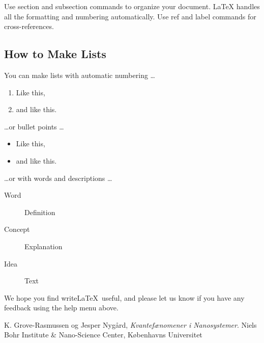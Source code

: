 \documentclass[a4paper]{article}
\begin{document}
Use section and subsection commands to organize your document. \LaTeX{} handles all the formatting and numbering automatically. Use ref and label commands for cross-references.

\subsection{How to Make Lists}

You can make lists with automatic numbering \dots

\begin{enumerate}
\item Like this,
\item and like this.
\end{enumerate}
\dots or bullet points \dots
\begin{itemize}
\item Like this,
\item and like this.
\end{itemize}
\dots or with words and descriptions \dots
\begin{description}
\item[Word] Definition
\item[Concept] Explanation
\item[Idea] Text
\end{description}

We hope you find write\LaTeX\ useful, and please let us know if you have any feedback using the help menu above.

\begin{thebibliography}{9}
  K. Grove-Rasmussen og Jesper Nygård,
  \emph{Kvantefænomener i Nanosystemer}.
  Niels Bohr Institute \& Nano-Science Center, Københavns Universitet

\end{thebibliography}
\end{document}
